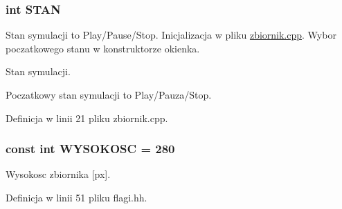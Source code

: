 \hypertarget{flagi_8hh_ae3a120c63186a17e4127a68187b3e9e8}{}
\subsubsection[{S\+T\+A\+N}]{\setlength{\rightskip}{0pt plus 5cm}int S\+T\+A\+N}\label{flagi_8hh_ae3a120c63186a17e4127a68187b3e9e8}
Stan symulacji to Play/\+Pause/\+Stop. Inicjalizacja w pliku \hyperlink{zbiornik_8cpp}{zbiornik.\+cpp}. Wybor poczatkowego stanu w konstruktorze okienka.

Stan symulacji.

Poczatkowy stan symulacji to Play/\+Pauza/\+Stop. 

Definicja w linii 21 pliku zbiornik.\+cpp.

\hypertarget{flagi_8hh_a073767f0ac7dbf009a42b00de1092b52}{}
\subsubsection[{W\+Y\+S\+O\+K\+O\+S\+C}]{\setlength{\rightskip}{0pt plus 5cm}const int W\+Y\+S\+O\+K\+O\+S\+C = 280}\label{flagi_8hh_a073767f0ac7dbf009a42b00de1092b52}
Wysokosc zbiornika \mbox{[}px\mbox{]}. 

Definicja w linii 51 pliku flagi.\+hh.

